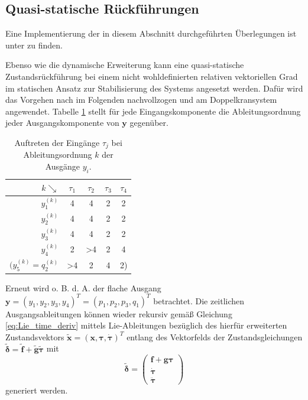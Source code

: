 \subsection{Quasi-statische Rückführungen}
\label{sec:quasi_static_control}
Eine Implementierung der in diesem Abschnitt durchgeführten Überlegungen ist unter \cite[flatness\_notebooks/ODE\_flatness\_trajectory\_control\_simulation\_qstat.ipynb]{SAGithub} zu finden.

Ebenso wie die dynamische Erweiterung kann eine quasi-statische Zustandsrückführung bei einem nicht wohldefinierten relativen vektoriellen Grad im statischen Ansatz zur Stabilisierung des Systems angesetzt werden. Dafür wird das Vorgehen nach \cite[S. 206]{NLRT_Roebenack} im Folgenden nachvollzogen und am Doppelkransystem angewendet. Tabelle \ref{tab:input_occurence} stellt für jede Eingangskomponente die Ableitungsordnung jeder Ausgangskomponente von $\mathbf{y}$ gegenüber.

\begin{table}[htbp]%
	\centering
	\caption{Auftreten der Eingänge $\tau_j$ bei Ableitungsordnung $k$ der Ausgänge $y_i$.}
	\label{tab:input_occurence}
	\begin{tabular}{ r| c c c c } 
		\toprule
		$k \searrow$ & $\tau_1$ & $\tau_2$ & $\tau_3$ & $\tau_4$ \\ 
		\hline
		$y_1^{(k)}$ & 4 & 4 & 2 & 2\\ 
		$y_2^{(k)}$ & 4 & 4 & 2 & 2\\
		$y_3^{(k)}$ & 4 & 4 & 2 & 2\\		
		$y_4^{(k)}$ & 2 & >4 & 2 & 4\\
		$(y_5^{(k)} = q_2^{(k)}$ & >4 & 2 & 4 & 2)\\
		\bottomrule
	\end{tabular}
\end{table}

Erneut wird o. B. d. A. der flache Ausgang ${\mathbf{y} = (y_1, y_2, y_3, y_4)^T = (p_1, p_2, p_3, q_1)^T}$ betrachtet. Die zeitlichen Ausgangsableitungen können wieder rekursiv gemäß Gleichung \eqref{eq:Lie_time_deriv} mittels Lie-Ableitungen bezüglich des hierfür erweiterten Zustandsvektors $\tilde{\mathbf{x}} = (\mathbf{x}, \boldsymbol{\tau}, \dot{\boldsymbol{\tau}})^T$ entlang des Vektorfelds der Zustandsgleichungen $\tilde{\boldsymbol{\delta}} = \tilde{\mathbf{f}} + \tilde{\mathbf{g}} \tilde{\boldsymbol{\tau}}$ mit
\begin{equation}
\tilde{\boldsymbol{\delta}} =
\left(\begin{matrix}
\mathbf{f} + \mathbf{g} \boldsymbol{\tau}\\
\dot{\boldsymbol{\tau}} \\
\ddot{\boldsymbol{\tau}}
\end{matrix}\right)
\end{equation}
generiert werden.

